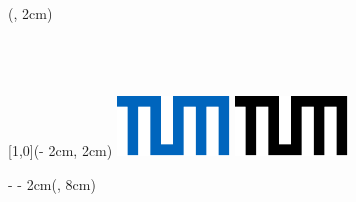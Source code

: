 \begin{titlepage}

\begin{textblock*}{\textwidth}(\coverborderleft, 2cm)%
    	\setlength{\baselineskip}{11pt}%
    	\ifx \monochromeCover \undefined
        	\textcolor{UniversitaetFarbe} { %
        	\fontsize{9}{11}\selectfont%
        	\sffamily \chair\\%
        	\sffamily \faculty\\%
        	\sffamily \uni }
    \else
        	\textcolor{black} { %
        	\fontsize{9}{11}\selectfont%
        	\sffamily \chair\\%
        	\sffamily \faculty\\%
        	\sffamily \uni }
    \fi
\end{textblock*}%

\begin{textblock*}{\UniversitaetLogoBreite}[1,0](\paperwidth - 2cm, 2cm)%
		\ifx \monochromeCover \undefined
        	\includegraphics{images/TUM_Logos/TUM_blau.pdf}%
        \else
        	\includegraphics{images/TUM_Logos/TUM_schwarz.pdf}%
        \fi
\end{textblock*}%

\begin{textblock*}{\paperwidth - \coverborderleft - 2cm}(\coverborderleft , 8cm)%
\raggedright %
{\sffamily \Large \worktype}\\
{\sffamily \huge \titleFirstLanguage \par} %
\vspace{1cm}
\sffamily \Large \textbf{\authorname}\\
\end{textblock*}

~\\ %
\end{titlepage}